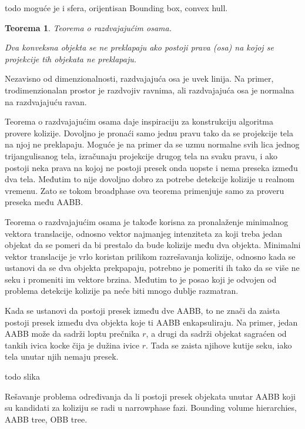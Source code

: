 \documentclass[12pt,oneside]{memoir}
\newtheorem{teo}{Teorema}[section]
\begin{document}
todo moguće je i sfera, orijentisan Bounding box, convex hull.

\begin{teo}
	Teorema o razdvajajućim osama. 

	Dva konveksna objekta se ne preklapaju ako postoji prava (osa) na kojoj se projekcije 
	tih objekata ne preklapaju. 
\end{teo}
Nezavisno od dimenzionalnosti, razdvajajuća osa je uvek linija. Na primer, trodimenzionalan prostor
je razdvojiv ravnima, ali razdvajajuća osa je normalna na razdvajajuću ravan.

Teorema o razdvajajućim osama daje inspiraciju za konstrukciju algoritma provere kolizije.
Dovoljno je pronaći samo jednu pravu tako da se  projekcije tela na njoj ne preklapaju.
Moguće je na primer da se uzmu normalne svih lica jednog trijangulisanog tela, izračunaju projekcije drugog 
tela na svaku pravu, i ako postoji neka prava na kojoj ne postoji presek onda uopste i nema preseka između
dva tela. Međutim to nije dovoljno dobro za potrebe detekcije kolizije u realnom vremenu. Zato se tokom 
broadphase ova teorema primenjuje samo za proveru preseka među AABB.

Teorema o razdvajajućim osama je takođe korisna za pronalaženje minimalnog vektora translacije, odnosno
vektor najmanjeg intenziteta za koji treba jedan objekat da se pomeri da bi prestalo da bude kolizije među dva objekta.
Minimalni vektor translacije je vrlo koristan prilikom razrešavanja kolizije, odnosno kada se ustanovi da
se dva objekta prekpapaju, potrebno je pomeriti ih tako da se više ne seku i promeniti im vektore brzina.
Međutim to je posao koji je odvojen od problema detekcije kolizije pa neće biti mnogo dublje razmatran.

Kada se ustanovi da postoji presek između dve AABB, to ne znači da zaista postoji presek između dva objekta
koje ti AABB enkapsuliraju. Na primer, jedan AABB može da sadrži loptu prečnika $r$, a drugi 
da sadrži objekat sagraćen od tankih ivica kocke čija je dužina ivice $r$. Tada se zaista njihove kutije 
seku, iako tela unutar njih nemaju presek.

todo slika

Rešavanje problema određivanja da li postoji presek objekata unutar AABB koji su kandidati za koliziju 
se radi u narrowphase fazi. Bounding volume hierarchies, AABB tree, OBB tree.
\end{document}
